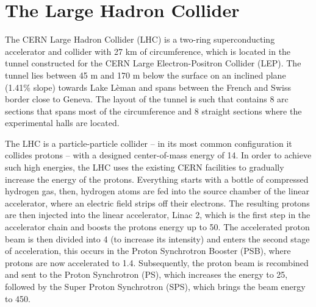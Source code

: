 \section{The Large Hadron Collider}
The CERN Large Hadron Collider (LHC) is a two-ring superconducting
accelerator and collider with 27 km of circumference, which is located
in the tunnel constructed for the CERN Large Electron-Positron
Collider (LEP). The tunnel lies between 45 m and 170 m below the
surface on an inclined plane (1.41\% slope) towards Lake L\`eman and
spans between the French and Swiss border close to Geneva. The layout
of the tunnel is such that contains 8 arc sections that spans most of
the circumference and 8 straight sections where the experimental halls
are located. 

The LHC is a particle-particle collider -- in its most common
configuration it collides protons -- with a designed center-of-mass
energy of 14\TeV. In order to achieve such high energies, the LHC uses
the existing CERN facilities to gradually increase the energy of the
protons. Everything starts with a bottle of compressed hydrogen gas,
then, hydrogen atoms are fed into the source chamber of the linear
accelerator, where an electric field strips off their
electrons. The resulting protons are then injected into the linear
accelerator, Linac 2, which is the first step in the
accelerator chain and boosts the
protons energy up to 50\MeV. The accelerated proton beam is then divided
into 4 (to increase its intensity) and enters the second stage of
acceleration, this occurs in the Proton Synchrotron Booster (PSB),
where protons are now accelerated to 1.4\GeV. Subsequently, the proton beam is
recombined and sent to the Proton Synchrotron (PS), which increases
the energy to 25\GeV, followed by the Super Proton Synchrotron (SPS),
which brings the beam energy to 450\GeV.

